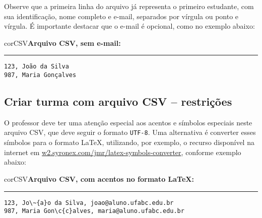 Observe que a primeira linha do arquivo já representa o primeiro estudante, com sua identificação, nome completo e e-mail, separados por vírgula ou ponto e vírgula. É importante destacar que o e-mail é opcional, como no exemplo abaixo:

\begin{myboxCode}{corCSV}{\textbf{Arquivo CSV, sem e-mail: }}\vspace{3mm}
\hrule
\begin{verbatim}
123, João da Silva
987, Maria Gonçalves
\end{verbatim}
\end{myboxCode}

\subsection{Criar turma com arquivo CSV -- restrições}\label{sec:professorCriarTurma2}

O professor deve ter uma atenção especial aos acentos e símbolos especiais neste arquivo CSV, que deve seguir o formato \texttt{UTF-8}. Uma alternativa é converter esses símbolos para o formato \LaTeX{}, utilizando, por exemplo, o recurso disponível na internet em \href{https://w2.syronex.com/jmr/latex-symbols-converter}{w2.syronex.com/jmr/latex-symbols-converter}, conforme exemplo abaixo:

\begin{myboxCode}{corCSV}{\textbf{Arquivo CSV, com acentos no formato \LaTeX: }}\vspace{3mm}
\hrule
\begin{verbatim}
123, Jo\~{a}o da Silva, joao@aluno.ufabc.edu.br
987, Maria Gon\c{c}alves, maria@aluno.ufabc.edu.br
\end{verbatim}
\end{myboxCode}


